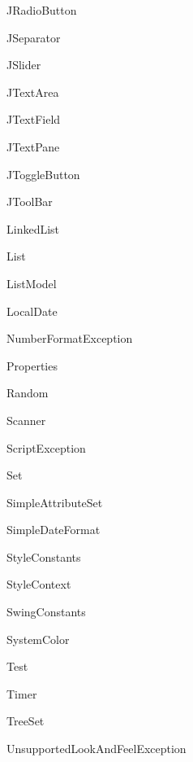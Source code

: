 \begin{DoxyCompactList}
\begin{DoxyCompactList}
\item {}
\end{DoxyCompactList}
\item J\+Radio\+Button\item J\+Separator\item J\+Slider\item J\+Text\+Area\item J\+Text\+Field\item J\+Text\+Pane\item J\+Toggle\+Button\item J\+Tool\+Bar\item Linked\+List\item List\item List\+Model\item Local\+Date\item Number\+Format\+Exception\item Properties\item Random\item Scanner\item Script\+Exception\item Set\item Simple\+Attribute\+Set\item Simple\+Date\+Format\item Style\+Constants\item Style\+Context\item Swing\+Constants\item System\+Color\item Test\item Timer\item Tree\+Set\item Unsupported\+Look\+And\+Feel\+Exception\end{DoxyCompactList}
